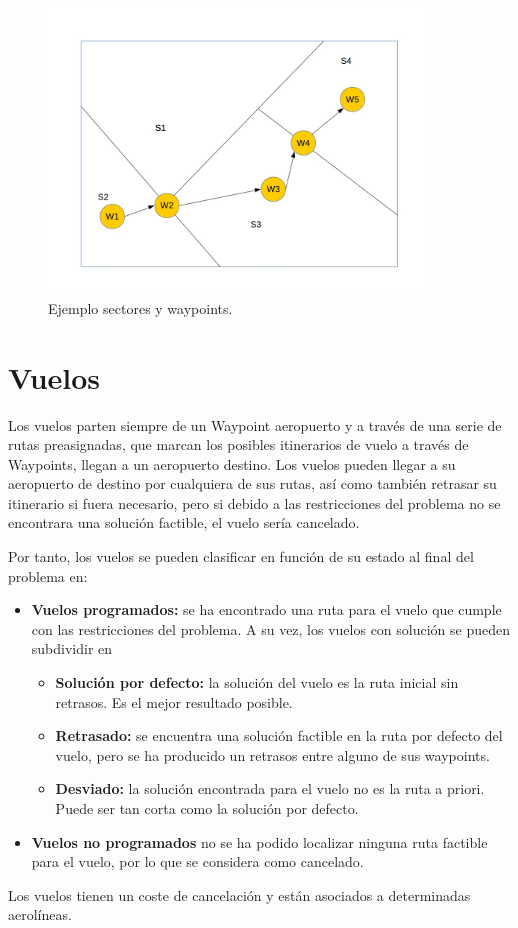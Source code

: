 \begin{figure}[h]
	\begin{center}
		\centering
		\includegraphics[width=0.9\textwidth]{./imagenes/descripcion_problema/sectoresYWaypoints.jpg}
		\caption{Ejemplo sectores y waypoints.}
		\label{fig: Ejemplo sectores y waypoints}
	\end{center}
\end{figure}


\section{Vuelos}
Los vuelos parten siempre de un Waypoint aeropuerto y a través de una serie de rutas preasignadas, que marcan los posibles itinerarios de vuelo a través de Waypoints, llegan a un aeropuerto destino. Los vuelos pueden llegar a su aeropuerto de destino por cualquiera de sus rutas, así como también retrasar su itinerario si fuera necesario, pero si debido a las restricciones del problema no se encontrara una solución factible, el vuelo sería cancelado.

Por tanto, los vuelos se pueden clasificar en función de su estado al final del problema en:
\begin{itemize}
	\item \textbf{Vuelos programados:} se ha encontrado una ruta para el vuelo que cumple con las restricciones del problema. A su vez, los vuelos con solución se pueden subdividir en
	\begin{itemize}
		\item \textbf{Solución por defecto:} la solución del vuelo es la ruta inicial sin retrasos. Es el mejor resultado posible.
		\item \textbf{Retrasado:} se encuentra una solución factible en la ruta por defecto del vuelo, pero se ha producido un retrasos entre alguno de sus waypoints.
		\item \textbf{Desviado:} la solución encontrada para el vuelo no es la ruta a priori. Puede ser tan corta como la solución por defecto.
	\end{itemize}
	\item \textbf{Vuelos no programados} no se ha podido localizar ninguna ruta factible para el vuelo, por lo que se considera como cancelado.
\end{itemize}
Los vuelos tienen un coste de cancelación y están asociados a determinadas aerolíneas.

